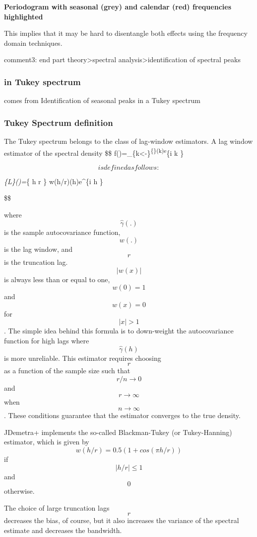 \documentclass[
  letterpaper,
  DIV=11,
  numbers=noendperiod]{scrreprt}
\begin{document}
\textbf{Periodogram with seasonal (grey) and calendar (red) frequencies
highlighted}

This implies that it may be hard to disentangle both effects using the
frequency domain techniques.

comment3: end part theory\textgreater spectral
analysis\textgreater identification of spectral peaks

\hypertarget{in-tukey-spectrum}{%
\subsubsection{in Tukey spectrum}\label{in-tukey-spectrum}}

comes from Identification of seasonal peaks in a Tukey spectrum

\hypertarget{tukey-spectrum-definition}{%
\subsubsection{Tukey Spectrum
definition}\label{tukey-spectrum-definition}}

The Tukey spectrum belongs to the class of lag-window estimators. A lag
window estimator of the spectral density \$\$
f(\omega)=\sum\_\{k\textless-\infty\}\textsuperscript{\{\infty\}\gamma(k)e}\{i
k \omega\}

\[ is defined as follows: \]

\emph{\{L\}(\omega)=\sum}\{\left\textbar{} h
\right\textbar{} \leq r \} w(h/r)\hat{\gamma}(h)e\^{}\{i h \omega\}

\$\$

where \[\hat{\gamma}(.) \] is the sample autocovariance function,
\[w(.)\] is the lag window, and \[r\] is the truncation lag.
\[\left| w(x)\right| \] is always less than or equal to one, \[w(0)=1\]
and \[w(x)=0\] for \[\left| x \right| > 1\]. The simple idea behind this
formula is to down-weight the autocovariance function for high lags
where \[\hat{\gamma}(h)\] is more unreliable. This estimator requires
choosing \[r\] as a function of the sample size such that
\[r/n \rightarrow 0 \] and \[r\rightarrow \infty \] when
\[ n \rightarrow \infty \] . These conditions guarantee that the
estimator converges to the true density.

JDemetra+ implements the so-called Blackman-Tukey (or Tukey-Hanning)
estimator, which is given by \[w(h/r)=0.5(1+cos(\pi h/r))\] if
\[\left| h/r \right| \leq 1\] and \[0\] otherwise.

The choice of large truncation lags \[r\] decreases the bias, of course,
but it also increases the variance of the spectral estimate and
decreases the bandwidth.
\end{document}

